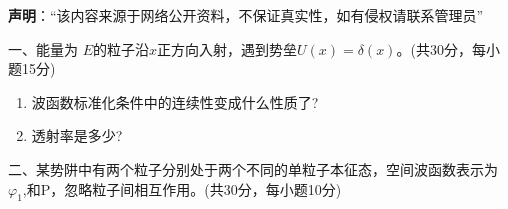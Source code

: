 
\textbf{声明}：“该内容来源于网络公开资料，不保证真实性，如有侵权请联系管理员”

一、能量为 $E$的粒子沿$x$正方向入射，遇到势垒$U(x)=\delta(x)$。(共30分，每小题15分)
\begin{enumerate}
\item 波函数标准化条件中的连续性变成什么性质了?
\item 透射率是多少?
\end{enumerate}

二、某势阱中有两个粒子分别处于两个不同的单粒子本征态，空间波函数表示为$\varphi_1$,和P，忽略粒子间相互作用。(共30分，每小题10分)